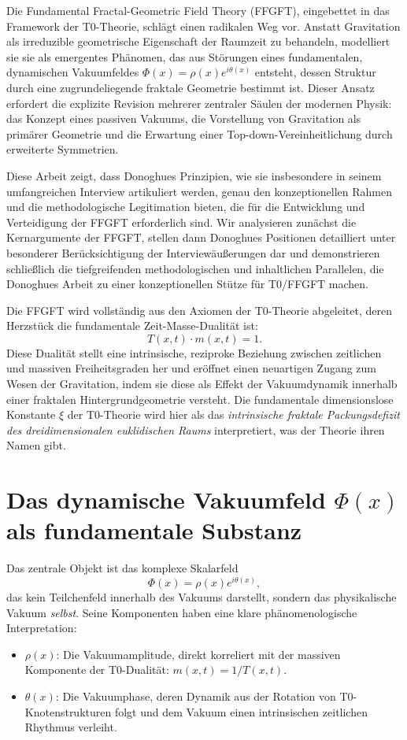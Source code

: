 	Die Fundamental Fractal-Geometric Field Theory (FFGFT), eingebettet in das Framework der T0-Theorie, schlägt einen radikalen Weg vor. Anstatt Gravitation als irreduzible geometrische Eigenschaft der Raumzeit zu behandeln, modelliert sie sie als emergentes Phänomen, das aus Störungen eines fundamentalen, dynamischen Vakuumfeldes $\Phi(x) = \rho(x) e^{i\theta(x)}$ entsteht, dessen Struktur durch eine zugrundeliegende fraktale Geometrie bestimmt ist. Dieser Ansatz erfordert die explizite Revision mehrerer zentraler Säulen der modernen Physik: das Konzept eines passiven Vakuums, die Vorstellung von Gravitation als primärer Geometrie und die Erwartung einer Top-down-Vereinheitlichung durch erweiterte Symmetrien.
	
	Diese Arbeit zeigt, dass Donoghues Prinzipien, wie sie insbesondere in seinem umfangreichen Interview \cite{DonoghueInterview2025} artikuliert werden, genau den konzeptionellen Rahmen und die methodologische Legitimation bieten, die für die Entwicklung und Verteidigung der FFGFT erforderlich sind. Wir analysieren zunächst die Kernargumente der FFGFT, stellen dann Donoghues Positionen detailliert unter besonderer Berücksichtigung der Interviewäußerungen dar und demonstrieren schließlich die tiefgreifenden methodologischen und inhaltlichen Parallelen, die Donoghues Arbeit zu einer konzeptionellen Stütze für T0/FFGFT machen.
	
	
	Die FFGFT wird vollständig aus den Axiomen der T0-Theorie abgeleitet, deren Herzstück die fundamentale Zeit-Masse-Dualität ist:
	\[
	T(x,t) \cdot m(x,t) = 1.
	\]
	Diese Dualität stellt eine intrinsische, reziproke Beziehung zwischen zeitlichen und massiven Freiheitsgraden her und eröffnet einen neuartigen Zugang zum Wesen der Gravitation, indem sie diese als Effekt der Vakuumdynamik innerhalb einer fraktalen Hintergrundgeometrie versteht. Die fundamentale dimensionslose Konstante $\xi$ der T0-Theorie wird hier als das \emph{intrinsische fraktale Packungsdefizit des dreidimensionalen euklidischen Raums} interpretiert, was der Theorie ihren Namen gibt.
	
	\section{Das dynamische Vakuumfeld \texorpdfstring{$\Phi(x)$}{Phi(x)} als fundamentale Substanz}
	
	Das zentrale Objekt ist das komplexe Skalarfeld
	\[
	\Phi(x) = \rho(x) e^{i\theta(x)},
	\]
	das kein Teilchenfeld innerhalb des Vakuums darstellt, sondern das physikalische Vakuum \emph{selbst}. Seine Komponenten haben eine klare phänomenologische Interpretation:
	\begin{itemize}
		\item $\rho(x)$: Die Vakuumamplitude, direkt korreliert mit der massiven Komponente der T0-Dualität: $m(x,t) = 1/T(x,t)$.
		\item $\theta(x)$: Die Vakuumphase, deren Dynamik aus der Rotation von T0-Knotenstrukturen folgt und dem Vakuum einen intrinsischen zeitlichen Rhythmus verleiht.
	\end{itemize}
	
